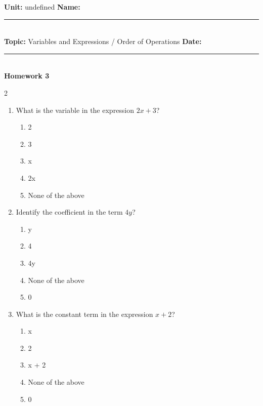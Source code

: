 \documentclass[10pt]{article}
\begin{document}
\enlargethispage{2.5cm}

\begin{tcolorbox}[colback=mainblue!5, colframe=mainblue, sharp corners, boxrule=0.5pt]
    \small \textbf{Unit:} undefined \hfill \textbf{Name:} \rule{3cm}{0.4pt} \\
    \small \textbf{Topic:} Variables and Expressions / Order of Operations \hfill \textbf{Date:} \rule{2cm}{0.4pt} \\
    \centering \textbf{\large Homework 3}
\end{tcolorbox}

\vspace{0.2cm}

\begin{multicols}{2}
\begin{enumerate}[label=\textbf{Q\arabic*.}, leftmargin=*, itemsep=6pt, parsep=0pt]

  \item \small What is the variable in the expression $2x + 3$?
  \begin{enumerate}[label=(\Alph*), leftmargin=0.6cm, nosep, itemsep=2pt]
    \item 2
    \item 3
    \item x
    \item 2x
    \item None of the above
  \end{enumerate}

  \item \small Identify the coefficient in the term $4y$?
  \begin{enumerate}[label=(\Alph*), leftmargin=0.6cm, nosep, itemsep=2pt]
    \item y
    \item 4
    \item 4y
    \item None of the above
    \item 0
  \end{enumerate}

  \item \small What is the constant term in the expression $x + 2$?
  \begin{enumerate}[label=(\Alph*), leftmargin=0.6cm, nosep, itemsep=2pt]
    \item x
    \item 2
    \item x + 2
    \item None of the above
    \item 0
  \end{enumerate}


\end{enumerate}
\end{multicols}
\end{document}
